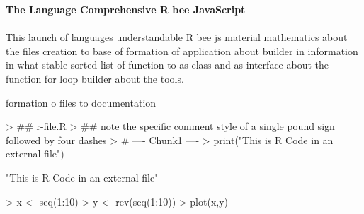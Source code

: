 \documentclass{article}
\begin{document}

\textbf{The Language Comprehensive R bee JavaScript}
\\\\
This launch of languages understandable R bee js material mathematics about the
files creation to base of formation of application about builder in information
in what stable sorted list of function to as class and as interface about the
function for loop builder about the tools.

formation o files to documentation
\begin{Schunk}
\begin{Sinput}
> ## r-file.R
> ## note the specific comment style of a single pound sign followed by four dashes
> # ---- Chunk1 ----
> print("This is R Code in an external file")
\end{Sinput}
\begin{Soutput}
[1] "This is R Code in an external file"
\end{Soutput}
\begin{Sinput}
> x <- seq(1:10)
> y <- rev(seq(1:10))
> plot(x,y)
\end{Sinput}
\end{Schunk}
\end{document}
